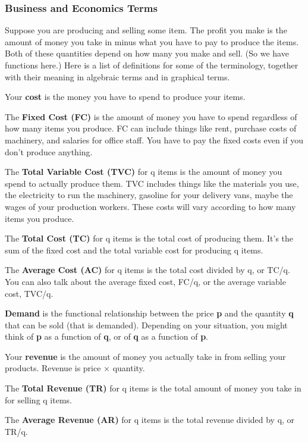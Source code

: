 \subsubsection{Business and Economics
Terms}\label{business-and-economics-terms}

Suppose you are producing and selling some item. The profit you make is
the amount of money you take in minus what you have to pay to produce
the items. Both of these quantities depend on how many you make and
sell. (So we have functions here.) Here is a list of definitions for
some of the terminology, together with their meaning in algebraic terms
and in graphical terms.

Your \textbf{cost} is the money you have to spend to produce your items.

The \textbf{Fixed Cost (FC)} is the amount of money you have to spend
regardless of how many items you produce. FC can include things like
rent, purchase costs of machinery, and salaries for office staff. You
have to pay the fixed costs even if you don't produce anything.

The \textbf{Total Variable Cost (TVC)} for q items is the amount of
money you spend to actually produce them. TVC includes things like the
materials you use, the electricity to run the machinery, gasoline for
your delivery vans, maybe the wages of your production workers. These
costs will vary according to how many items you produce.

The \textbf{Total Cost (TC)} for q items is the total cost of producing
them. It's the sum of the fixed cost and the total variable cost for
producing q items.

The \textbf{Average Cost (AC)} for q items is the total cost divided by
q, or TC/q. You can also talk about the average fixed cost, FC/q, or the
average variable cost, TVC/q.

\textbf{Demand} is the functional relationship between the price
\textbf{p} and the quantity \textbf{q} that can be sold (that is
demanded). Depending on your situation, you might think of \textbf{p} as
a function of \textbf{q}, or of \textbf{q} as a function of \textbf{p}.

Your \textbf{revenue} is the amount of money you actually take in from
selling your products. Revenue is price × quantity.

The \textbf{Total Revenue (TR)} for q items is the total amount of money
you take in for selling q items.

The \textbf{Average Revenue (AR)} for q items is the total revenue
divided by q, or TR/q.

